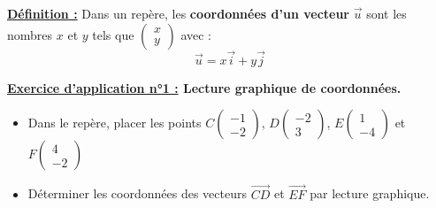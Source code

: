 \documentclass[12pt]{article}
\newcommand*{\Coord}[2]{%
  \ensuremath{
    \begin{pmatrix} 
      #1\\ 
      #2 
    \end{pmatrix}}}
\begin{document}
\begin{mdframed}[
    linewidth=1pt,
    roundcorner=5pt,
    linecolor=ForestGreen,
    innertopmargin=10pt,
    innerbottommargin=10pt
]
{\color{ForestGreen}\textbf{\underline{Définition :}}}
Dans un repère, les \textbf{coordonnées d’un vecteur} $\overrightarrow{u}$ sont les nombres 
$x$ et $y$ tels que $\Coord{x}{y}$ avec :
\[
\overrightarrow{u} = x\overrightarrow{i} + y\overrightarrow{j}
\]
\end{mdframed}

\vspace{10pt}

\begin{mdframed}[
    linewidth=1pt,
    roundcorner=5pt,
    linecolor=RoyalBlue,
    innertopmargin=10pt,
    innerbottommargin=10pt
]
{\color{RoyalBlue}\textbf{\underline{Exercice d'application n°1 :} Lecture graphique de coordonnées.}}
\vspace{10pt}

\begin{minipage}{.45\textwidth}%
\end{minipage}%
\hfill
\begin{minipage}{.55\textwidth}%
    \begin{itemize}
        \item Dans le repère, placer les points $C\Coord{-1}{-2}$, $D\Coord{-2}{3}$,
        $E\Coord{1}{-4}$ et $F\Coord{4}{-2}$
        \vspace{5pt}
        \item Déterminer les coordonnées des vecteurs 
        $\overrightarrow{CD}$ et $\overrightarrow{EF}$ par lecture graphique.
    \end{itemize}
\end{minipage}%

\end{mdframed}
\end{document}
